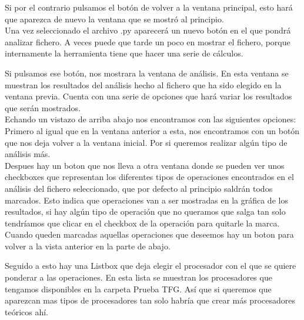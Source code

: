 
Si por el contrario pulsamos el botón de volver a la ventana principal, esto hará que aparezca de nuevo la ventana que se mostró al principio.\\

Una vez seleccionado el archivo .py aparecerá un nuevo botón en el que pondrá analizar fichero. A veces puede que tarde un poco en mostrar el fichero, porque internamente la herramienta tiene que hacer una serie de cálculos.\\



Si pulsamos ese botón, nos mostrara la ventana de análisis. En esta ventana se muestran los resultados del análisis hecho al fichero que ha sido elegido en la ventana previa. Cuenta con una serie de opciones que hará variar los resultados que serán mostrados.\\

Echando un vistazo de arriba abajo nos encontramos con las siguientes opciones:\\

Primero al igual que en la ventana anterior a esta, nos encontramos con un botón que nos deja volver a la ventana inicial. Por si queremos realizar algún tipo de análisis más.\\

Despues hay un boton que nos lleva a otra ventana donde se pueden ver unos checkboxes que representan los diferentes tipos de operaciones encontrados en el análisis del fichero seleccionado, que por defecto al principio saldrán todos marcados. Esto indica que operaciones van a ser mostradas en la gráfica de los resultados, si hay algún tipo de operación que no queramos que salga tan solo tendríamos que clicar en el checkbox de la operación para quitarle la marca. Cuando queden marcadas aquellas operaciones que deseemos hay un boton para volver a la vista anterior en la parte de abajo.\\


Seguido a esto hay una Listbox que deja elegir el procesador con el que se quiere ponderar a las operaciones. En esta lista se muestran los procesadores que tengamos disponibles en la carpeta Prueba TFG. Así que si queremos que aparezcan mas tipos de procesadores tan solo habría que crear más procesadores teóricos ahí.\\

